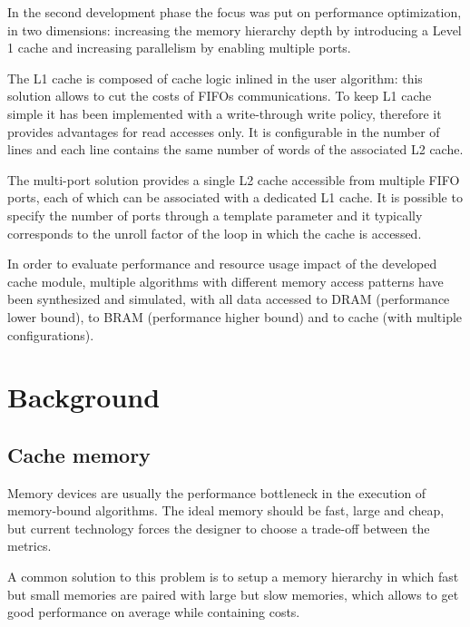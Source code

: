 \documentclass[11pt,a4paper]{memoir}
\begin{document}
\bigskip
In the second development phase the focus was put on performance optimization,
in two dimensions: increasing the memory hierarchy depth by introducing a Level
1 cache and increasing parallelism by enabling multiple ports.

The L1 cache is composed of cache logic inlined in the user algorithm: this
solution allows to cut the costs of FIFOs communications. To keep L1 cache
simple it has been implemented with a write-through write policy, therefore
it provides advantages for read accesses only. It is configurable in the
number of lines and each line contains the same number of words of the
associated L2 cache.

The multi-port solution provides a single L2 cache accessible from multiple
FIFO ports, each of which can be associated with a dedicated L1 cache.
It is possible to specify the number of ports through a template parameter and
it typically corresponds to the unroll factor of the loop in which the cache
is accessed.

\bigskip
In order to evaluate performance and resource usage impact of the developed
cache module, multiple algorithms with different memory access patterns have
been synthesized and simulated, with all data accessed to DRAM (performance
lower bound), to BRAM (performance higher bound) and to cache (with multiple
configurations).

\vfill
\pagebreak

\tableofcontents*
\pagebreak

\printacronyms[display=all,heading=chapter,name={List of Acronyms}]
\vfill
\pagebreak

\listoffigures
\vfill
\pagebreak

\listoftables
\vfill
\pagebreak

\mainmatter
\chapter{Background}
\section{Cache memory}
Memory devices are usually the performance bottleneck in the execution of
memory-bound algorithms.
The ideal memory should be fast, large and cheap, but current technology forces
the designer to choose a trade-off between the metrics.

A common solution to this problem is to setup a memory hierarchy in
which fast but small memories are paired with large but slow memories, which
allows to get good performance on average while containing costs.
\end{document}
